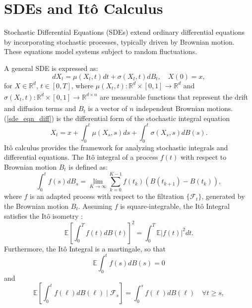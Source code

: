 \documentclass[11pt, twoside]{report}
\begin{document}
\section{SDEs and It\^{o} Calculus}
Stochastic Differential Equations (SDEs) extend ordinary differential equations by incorporating stochastic processes, typically driven by Brownian motion. These equations model systems subject to random fluctuations.

A general SDE is expressed as:
\begin{equation} \label{sde_eqn_diff}
    dX_t = \mu(X_t, t) dt + \sigma(X_t, t) dB_t, \quad X(0) = x,
\end{equation}
for $X \in \mathbb{R}^d$, $t \in [0,T]$, where $\mu(X_t, t): \mathbb{R}^d \times [0,1] \xrightarrow[]{} \mathbb{R}^d$ and $\sigma(X_t, t): \mathbb{R}^d \times [0,1] \xrightarrow[]{} \mathbb{R}^{d \times n}$ are measurable functions that represent the drift and diffusion terms and $B_t$ is a vector of $n$ independent Brownian motions. (\ref{sde_eqn_diff}) is the differential form of the stochastic integral equation
\begin{equation} \label{sde_eqn_int}
    X_t = x + \int_0^t \mu(X_s, s) ds + \int_0^t\sigma(X_s, s) dB(s).
\end{equation}
It\^{o} calculus provides the framework for analyzing stochastic integrals and differential equations. The It\^{o} integral of a process $f(t)$ with respect to Brownian motion $B_t$ is defined as:
\begin{equation} \label{ito_int}
    \int_0^t f(s) dB_s = \lim_{K \xrightarrow[]{} \infty} \sum_{k=0}^{K-1} f(t_k) (B(t_{k+1}) - B(t_k)),
\end{equation}
where $f$ is an adapted process with respect to the filtration $\{\mathcal{F}_t\}$, generated by the Brownian motion $B_t$. Assuming $f$ is square-integrable, the It\^{o} Integral satisfies the It\^{o} isometry \cite{pavliotis_book}:
\begin{equation} \label{ito_isometry}
    \mathbb{E} \left[ \int_0^T f(t) dB(t)\right]^2 = \int_0^T \mathbb{E}|f(t)|^2 dt.
\end{equation}
Furthermore, the It\^{o} Integral is a martingale, so that 
\begin{equation} \label{ito_martin_mean}
    \mathbb{E} \int_0^t f(s) d B(s)=0
\end{equation}
and
\begin{equation} \label{ito_martin}
\mathbb{E}\left[\int_0^t f(\ell) d B(\ell) \mid \mathcal{F}_s\right]=\int_0^s f(\ell) d B(\ell) \quad \forall t \geqslant s,
\end{equation}
\end{document}
